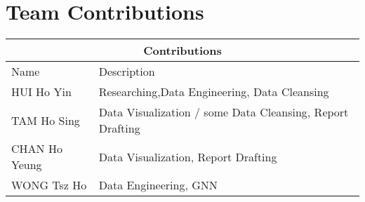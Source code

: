 \section{Team Contributions}
\begin{tabular}{ |p{2.5cm}||p{4cm}|  }
 \hline
 \multicolumn{2}{|c|}{Contributions} \\
 \hline
 Name    & Description\\
 \hline
 HUI Ho Yin & Researching,Data Engineering, Data Cleansing\\
 \hline
 TAM Ho Sing & Data Visualization / some Data Cleansing, Report Drafting \\
 \hline
 CHAN Ho Yeung &  Data Visualization, Report Drafting\\
 \hline
 WONG Tsz Ho & Data Engineering, GNN \\
 \hline
\end{tabular}\\






